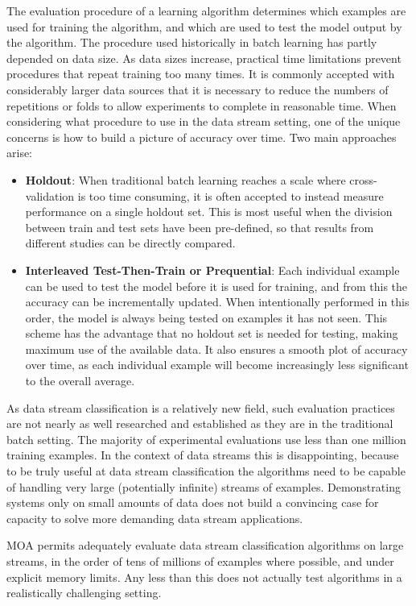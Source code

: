 \documentclass[a4paper,12pt,twoside]{book}
\begin{document}
The evaluation procedure of a learning algorithm determines which examples
are used for training the algorithm, and which are used to test the model output
by the algorithm. The procedure used historically in batch learning has partly
depended on data size. As data sizes increase, practical
time limitations prevent procedures that repeat training too many times. It is
commonly accepted with considerably larger data sources that it is necessary
to reduce the numbers of repetitions or folds to allow experiments to complete
in reasonable time. 
    When considering what procedure to use in the data stream setting, one of
the unique concerns is how to build a picture of accuracy over time. Two main
approaches arise:
\begin{itemize}
 \item {\bf Holdout}:
When traditional batch learning reaches a scale where cross-validation is too time 
consuming, it is often accepted to instead measure performance on a single holdout
set. This is most useful when the division between train and test sets have
been pre-defined, so that results from different studies can be directly compared. 
\item {\bf Interleaved Test-Then-Train or Prequential}:
 Each individual example can be used to test the model
before it is used for training, and from this the accuracy can be incrementally
updated. When intentionally performed in this order, the model is always
being tested on examples it has not seen. This scheme has the advantage that
no holdout set is needed for testing, making maximum use of the available
data. It also ensures a smooth plot of accuracy over time, as each individual
example will become increasingly less significant to the overall average.
\end{itemize}
   As data stream classification is a relatively new field, such evaluation 
practices are not nearly as well researched and established as they are
in the traditional batch setting. 
The majority of experimental evaluations use less than one million
training examples. 
In the context of data streams this is disappointing, because to be
truly useful at data stream classification the algorithms need to be capable of 
handling very large (potentially infinite) streams of examples. Demonstrating 
systems only on small amounts of data does not build a convincing case for capacity
to solve more demanding data stream applications.

    MOA permits adequately evaluate data stream
classification algorithms on large streams, in the order
of tens of millions of examples where possible, and under explicit memory
limits. Any less than this does not actually test algorithms in a realistically
challenging setting. 
\end{document}
